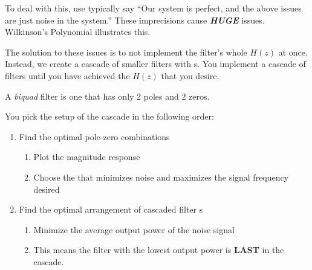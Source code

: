 To deal with this, use typically say ``Our system is perfect, and the above issues are just noise in the system.''
These imprecisions cause \textbf{\emph{\large{HUGE}}} issues.
Wilkinson's Polynomial illustrates this.

The solution to these issues is to not implement the filter's whole $H(z)$ at once.
Instead, we create a cascade of smaller filters with s.
You implement a cascade of  filters until you have achieved the $H(z)$ that you desire.

\begin{definition}[Biquad]\label{def:Biquad}
  A \emph{biquad} filter is one that has only 2 poles and 2 zeros.
\end{definition}

You pick the setup of the cascade in the following order:
\begin{enumerate}[noitemsep]
\item Find the optimal pole-zero combinations
  \begin{enumerate}[noitemsep]
  \item Plot the magnitude response
  \item Choose the  that minimizes noise and maximizes the signal frequency desired
  \end{enumerate}
\item Find the optimal arrangement of cascaded filter s
  \begin{enumerate}[noitemsep]
  \item Minimize the average output power of the noise signal
  \item This means the filter with the lowest output power is \textbf{LAST} in the cascade.
  \end{enumerate}
\end{enumerate}

